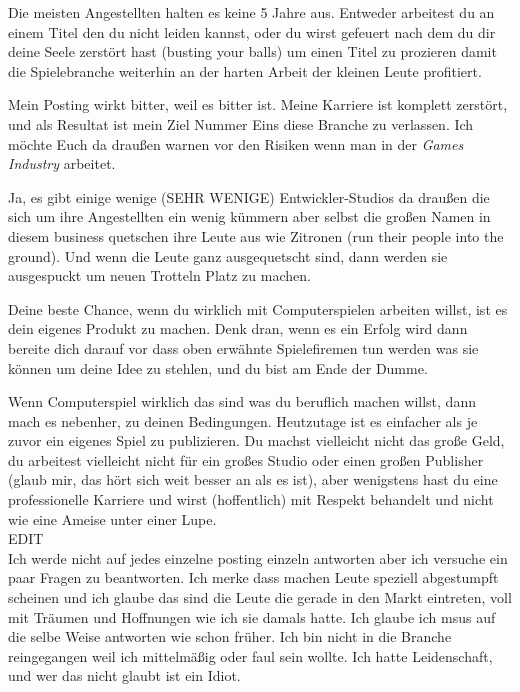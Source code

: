Die meisten Angestellten halten es keine 5 Jahre aus. Entweder arbeitest du an einem Titel den du nicht leiden kannst, oder du wirst gefeuert nach dem du dir deine Seele zerstört hast (busting your balls) um einen Titel zu prozieren damit die Spielebranche weiterhin an der harten Arbeit der kleinen Leute profitiert.

Mein Posting wirkt bitter, weil es bitter ist. Meine Karriere ist komplett zerstört, und als Resultat ist mein Ziel Nummer Eins diese Branche zu verlassen. Ich möchte Euch da draußen warnen vor den Risiken wenn man in der \textit{Games Industry} arbeitet.

Ja, es gibt einige wenige (SEHR WENIGE) Entwickler-Studios da draußen die sich um ihre Angestellten ein wenig kümmern aber selbst die großen Namen in diesem business quetschen ihre Leute aus wie Zitronen (run their people into the ground). Und wenn die Leute ganz ausgequetscht sind, dann werden sie ausgespuckt um neuen Trotteln Platz zu machen.

Deine beste Chance, wenn du wirklich mit Computerspielen arbeiten willst, ist es dein eigenes Produkt zu machen. Denk dran, wenn es ein Erfolg wird dann bereite dich darauf vor dass oben erwähnte Spielefiremen tun werden was sie können um deine Idee zu stehlen, und du bist am Ende der Dumme. 

Wenn Computerspiel wirklich das sind was du beruflich machen willst, dann mach es nebenher, zu deinen Bedingungen. Heutzutage ist es einfacher als je zuvor ein eigenes Spiel zu publizieren. Du machst vielleicht nicht das große Geld, du arbeitest vielleicht nicht für ein großes Studio oder einen großen Publisher (glaub mir, das hört sich weit besser an als es ist), aber wenigstens hast du eine professionelle Karriere und wirst (hoffentlich) mit Respekt behandelt und nicht wie eine Ameise unter einer Lupe.\\

EDIT\\

Ich werde nicht auf jedes einzelne posting einzeln antworten aber ich versuche ein paar Fragen zu beantworten. Ich merke dass machen Leute speziell abgestumpft scheinen und ich glaube das sind die Leute die gerade in den Markt eintreten, voll mit Träumen und Hoffnungen wie ich sie damals hatte. Ich glaube ich msus auf die selbe Weise antworten wie schon früher. Ich bin nicht in die Branche reingegangen weil ich mittelmäßig oder faul sein wollte. Ich hatte Leidenschaft, und wer das nicht glaubt ist ein Idiot.

